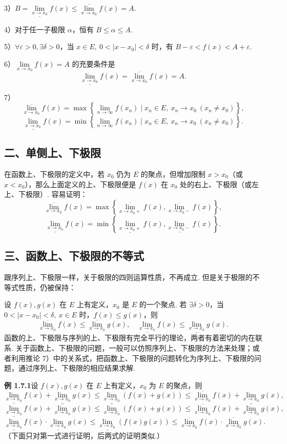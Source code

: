 \documentclass[UTF8, 12pt, fontset=fandol, oneside]{ctexart}
\begin{document}
3）$B=\underline{\lim\limits_{x\to x_0}}f(x)\le \overline{\lim\limits_{x\to x_0}}f(x)=A$.

4）对于任一子极限 $\alpha$，恒有 $B\le\alpha\le A$.

5）$\forall \varepsilon>0,\exists\delta>0$，当 $x\in E,\ 0<|x-x_0|<\delta$ 时，有 $B-\varepsilon<f(x)<A+\varepsilon$.

6）$\lim\limits_{x\to x_0}f(x)=A$ 的充要条件是
\[
  \underline{\lim_{x\to x_0}}f(x)=\overline{\lim_{x\to x_0}}f(x)=A.
\]

7）
\[
  \overline{\lim_{x\to x_0}}f(x)
  =\max\left\{\lim_{n\to\infty}f(x_n)\mid x_n\in E,\ x_n\to x_0\ (x_n\ne x_0)\right\},
\]
\[
  \underline{\lim_{x\to x_0}}f(x)
  =\min\left\{\lim_{n\to\infty}f(x_n)\mid x_n\in E,\ x_n\to x_0\ (x_n\ne x_0)\right\}.
\]

\subsection*{二、单侧上、下极限}

在函数上、下极限的定义中，若 $x_0$ 仍为 $E$ 的聚点，但增加限制 $x>x_0$（或 $x<x_0$），那么上面定义的上、下极限便是 $f(x)$ 在 $x_0$ 处的右上、下极限（或左上、下极限）. 容易证明：
\[
  \overline{\lim_{x\to x_0}}f(x)
  =\max\left\{\overline{\lim_{x\to x_0+}}f(x),\overline{\lim_{x\to x_0-}}f(x)\right\},
\]
\[
  \underline{\lim_{x\to x_0}}f(x)
  =\min\left\{\underline{\lim_{x\to x_0+}}f(x),\underline{\lim_{x\to x_0-}}f(x)\right\}.
\]

\subsection*{三、函数上、下极限的不等式}

跟序列上、下极限一样，关于极限的四则运算性质，不再成立. 但是关于极限的不等式性质，仍被保持：

设 $f(x),g(x)$ 在 $E$ 上有定义，$x_0$ 是 $E$ 的一个聚点. 若 $\exists\delta>0$，当 $0<|x-x_0|<\delta,\ x\in E$ 时，$f(x)\le g(x)$，则
\[
  \overline{\lim_{x\to x_0}}f(x)\le \overline{\lim_{x\to x_0}}g(x),\quad
  \underline{\lim_{x\to x_0}}f(x)\le \underline{\lim_{x\to x_0}}g(x).
\]
函数的上、下极限与序列的上、下极限有完全平行的理论，两者有着密切的内在联系. 关于函数上、下极限的问题，一般可以仿照序列上、下极限的方法来处理；或者利用推论 7）中的关系式，把函数上、下极限的问题转化为序列上、下极限的问题，通过序列上、下极限的相应结果求解.

\noindent\textbf{例 1.7.1}\quad 设 $f(x),g(x)$ 在 $E$ 上有定义，$x_0$ 为 $E$ 的聚点，则
\[
  \underline{\lim_{x\to x_0}}f(x)+\underline{\lim_{x\to x_0}}g(x)
  \le \underline{\lim_{x\to x_0}}(f(x)+g(x))
  \le \overline{\lim_{x\to x_0}}f(x)+\underline{\lim_{x\to x_0}}g(x),
\]
\[
  \underline{\lim_{x\to x_0}}f(x)+\overline{\lim_{x\to x_0}}g(x)
  \le \overline{\lim_{x\to x_0}}(f(x)+g(x))
  \le \overline{\lim_{x\to x_0}}f(x)+\overline{\lim_{x\to x_0}}g(x),
\]
\[
  \underline{\lim_{x\to x_0}}f(x)\cdot\underline{\lim_{x\to x_0}}g(x)
  \le \underline{\lim_{x\to x_0}}(f(x)g(x))
  \le \overline{\lim_{x\to x_0}}f(x)\cdot\overline{\lim_{x\to x_0}}g(x).
\]
（下面只对第一式进行证明，后两式的证明类似.）
\end{document}
